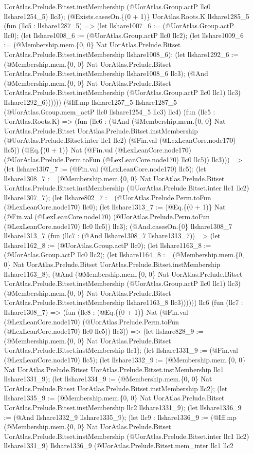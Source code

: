 \documentclass[11pt]{article}
\begin{document}
UorAtlas.Prelude.Bitset.instMembership (@UorAtlas.Group.actP llc0 llshare1254\_5) llc3); (@Exists.casesOn.\{(0 + 1)\} UorAtlas.Roots.K llshare1285\_5 (fun (llc5 : llshare1287\_5) => (let llshare1007\_6 := (@UorAtlas.Group.actP llc0); (let llshare1008\_6 := (@UorAtlas.Group.actP llc0 llc2); (let llshare1009\_6 := (@Membership.mem.\{0, 0\} Nat UorAtlas.Prelude.Bitset UorAtlas.Prelude.Bitset.instMembership llshare1008\_6); (let llshare1292\_6 := (@Membership.mem.\{0, 0\} Nat UorAtlas.Prelude.Bitset UorAtlas.Prelude.Bitset.instMembership llshare1008\_6 llc3); (@And (@Membership.mem.\{0, 0\} Nat UorAtlas.Prelude.Bitset UorAtlas.Prelude.Bitset.instMembership (@UorAtlas.Group.actP llc0 llc1) llc3) llshare1292\_6)))))) (@Iff.mp llshare1257\_5 llshare1287\_5 (@UorAtlas.Group.mem\_actP llc0 llshare1254\_5 llc3) llc4) (fun (llc5 : UorAtlas.Roots.K) => (fun (llc6 : (@And (@Membership.mem.\{0, 0\} Nat UorAtlas.Prelude.Bitset UorAtlas.Prelude.Bitset.instMembership (@UorAtlas.Prelude.Bitset.inter llc1 llc2) (@Fin.val (@LexLeanCore.node170) llc5)) (@Eq.\{(0 + 1)\} Nat (@Fin.val (@LexLeanCore.node170) (@UorAtlas.Prelude.Perm.toFun (@LexLeanCore.node170) llc0 llc5)) llc3))) => (let llshare1307\_7 := (@Fin.val (@LexLeanCore.node170) llc5); (let llshare1308\_7 := (@Membership.mem.\{0, 0\} Nat UorAtlas.Prelude.Bitset UorAtlas.Prelude.Bitset.instMembership (@UorAtlas.Prelude.Bitset.inter llc1 llc2) llshare1307\_7); (let llshare802\_7 := (@UorAtlas.Prelude.Perm.toFun (@LexLeanCore.node170) llc0); (let llshare1313\_7 := (@Eq.\{(0 + 1)\} Nat (@Fin.val (@LexLeanCore.node170) (@UorAtlas.Prelude.Perm.toFun (@LexLeanCore.node170) llc0 llc5)) llc3); (@And.casesOn.\{0\} llshare1308\_7 llshare1313\_7 (fun (llc7 : (@And llshare1308\_7 llshare1313\_7)) => (let llshare1162\_8 := (@UorAtlas.Group.actP llc0); (let llshare1163\_8 := (@UorAtlas.Group.actP llc0 llc2); (let llshare1164\_8 := (@Membership.mem.\{0, 0\} Nat UorAtlas.Prelude.Bitset UorAtlas.Prelude.Bitset.instMembership llshare1163\_8); (@And (@Membership.mem.\{0, 0\} Nat UorAtlas.Prelude.Bitset UorAtlas.Prelude.Bitset.instMembership (@UorAtlas.Group.actP llc0 llc1) llc3) (@Membership.mem.\{0, 0\} Nat UorAtlas.Prelude.Bitset UorAtlas.Prelude.Bitset.instMembership llshare1163\_8 llc3)))))) llc6 (fun (llc7 : llshare1308\_7) => (fun (llc8 : (@Eq.\{(0 + 1)\} Nat (@Fin.val (@LexLeanCore.node170) (@UorAtlas.Prelude.Perm.toFun (@LexLeanCore.node170) llc0 llc5)) llc3)) => (let llshare828\_9 := (@Membership.mem.\{0, 0\} Nat UorAtlas.Prelude.Bitset UorAtlas.Prelude.Bitset.instMembership llc1); (let llshare1331\_9 := (@Fin.val (@LexLeanCore.node170) llc5); (let llshare1332\_9 := (@Membership.mem.\{0, 0\} Nat UorAtlas.Prelude.Bitset UorAtlas.Prelude.Bitset.instMembership llc1 llshare1331\_9); (let llshare1334\_9 := (@Membership.mem.\{0, 0\} Nat UorAtlas.Prelude.Bitset UorAtlas.Prelude.Bitset.instMembership llc2); (let llshare1335\_9 := (@Membership.mem.\{0, 0\} Nat UorAtlas.Prelude.Bitset UorAtlas.Prelude.Bitset.instMembership llc2 llshare1331\_9); (let llshare1336\_9 := (@And llshare1332\_9 llshare1335\_9); (let llc9 : llshare1336\_9 := (@Iff.mp (@Membership.mem.\{0, 0\} Nat UorAtlas.Prelude.Bitset UorAtlas.Prelude.Bitset.instMembership (@UorAtlas.Prelude.Bitset.inter llc1 llc2) llshare1331\_9) llshare1336\_9 (@UorAtlas.Prelude.Bitset.mem\_inter llc1 llc2 
\end{document}
